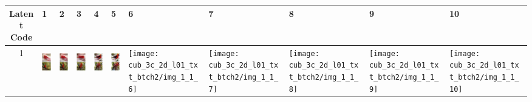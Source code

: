\documentclass{article}
\begin{document}
\begin{table}[H]
\begin{tabularx}{\textwidth}{|c|X|X|X|X|X|X|X|X|X|X|}
\hline
Latent Code & 1 & 2 & 3 & 4 & 5 & 6 & 7 & 8 & 9 & 10\\
\hline
1 & \includegraphics[keepaspectratio,height=50px]{cub_3c_2d_l01_txt_btch2/img_1_1_1} & \includegraphics[keepaspectratio,height=50px]{cub_3c_2d_l01_txt_btch2/img_1_1_2} & \includegraphics[keepaspectratio,height=50px]{cub_3c_2d_l01_txt_btch2/img_1_1_3} & \includegraphics[keepaspectratio,height=50px]{cub_3c_2d_l01_txt_btch2/img_1_1_4} & \includegraphics[keepaspectratio,height=50px]{cub_3c_2d_l01_txt_btch2/img_1_1_5} & \texttt{[image: cub\_3c\_2d\_l01\_txt\_btch2/img\_1\_1\_6]} & \texttt{[image: cub\_3c\_2d\_l01\_txt\_btch2/img\_1\_1\_7]} & \texttt{[image: cub\_3c\_2d\_l01\_txt\_btch2/img\_1\_1\_8]} & \texttt{[image: cub\_3c\_2d\_l01\_txt\_btch2/img\_1\_1\_9]} & \texttt{[image: cub\_3c\_2d\_l01\_txt\_btch2/img\_1\_1\_10]} \\\hline

\end{tabularx}
\end{table}
\end{document}
